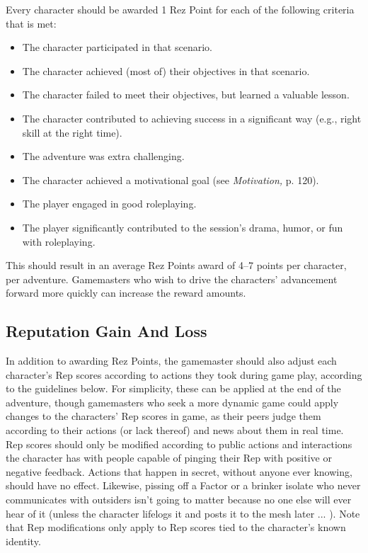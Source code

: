 Every character should be awarded 1 Rez Point for 
each of the following criteria that is met:
\begin{itemize}
\item  The character participated in that scenario.
\item  The character achieved (most of) their objectives in that scenario.
\item  The character failed to meet their objectives, but learned a valuable lesson.
\item  The character contributed to achieving success in a significant way (e.g., right skill at the right time).
\item  The adventure was extra challenging.
\item  The character achieved a motivational goal (see \textit{Motivation,} p. 120).
\item  The player engaged in good roleplaying.
\item  The player significantly contributed to the session's drama, humor, or fun with roleplaying.
\end{itemize}

This should result in an average Rez Points award 
of 4–7 points per character, per adventure. Gamemasters
who wish to drive the characters' advancement
forward more quickly can increase the reward
amounts. 

\subsection{Reputation Gain And Loss}

In addition to awarding Rez Points, the gamemaster 
should also adjust each character's Rep scores according
to actions they took during game play, according to
the guidelines below. For simplicity, these can be applied 
at the end of the adventure, though gamemasters who 
seek a more dynamic game could apply changes to the 
characters' Rep scores in game, as their peers judge 
them according to their actions (or lack thereof) and 
news about them in real time. Rep scores should only 
be modified according to public actions and interactions 
the character has with people capable of pinging their 
Rep with positive or negative feedback. Actions that 
happen in secret, without anyone ever knowing, should 
have no effect. Likewise, pissing off a Factor or a brinker 
isolate who never communicates with outsiders isn't 
going to matter because no one else will ever hear of it 
(unless the character lifelogs it and posts it to the mesh 
later ... ). Note that Rep modifications only apply to Rep 
scores tied to the character's known identity. 

